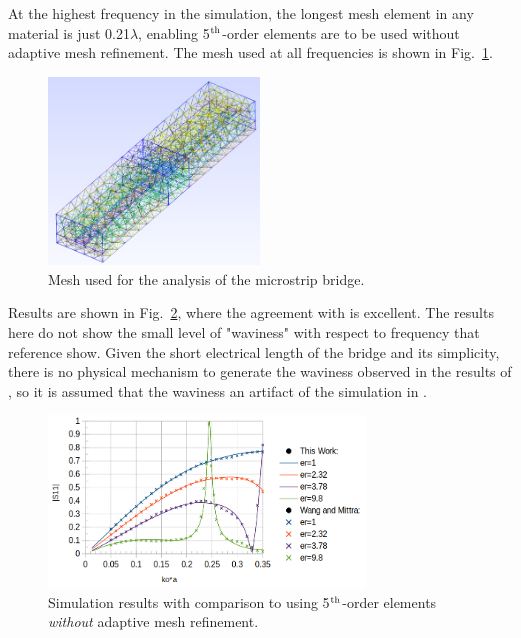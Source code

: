 \documentclass[titlepage]{article}
\renewcommand\_{\textunderscore\linebreak[1]}
\begin{document}
At the highest frequency in the simulation, the longest mesh element in any material is just 0.21$\lambda$, enabling 5$^{\textnormal{th}}$-order elements are to be used without adaptive mesh refinement.  The mesh used at all frequencies is shown in Fig.~\ref{fig:bridge_mesh}.

\begin{figure}[H]
  \centering
  \includegraphics[width=0.5\textwidth]{../regression/OpenParEM3D/microstrip/bridge_study/screenshots/bridge_mesh}
  \caption{Mesh used for the analysis of the microstrip bridge.}
  \label{fig:bridge_mesh}
\end{figure}

Results are shown in Fig.~\ref{fig:bridge_results}, where the agreement with \cite{Wang} is excellent.  The results here do not show the small level of "waviness" with respect to frequency that reference \cite{Wang} show.  Given the short electrical length of the bridge and its simplicity, there is no physical mechanism to generate the waviness observed in the results of \cite{Wang}, so it is assumed that the waviness an artifact of the simulation in \cite{Wang}.

\begin{figure}[H]
  \centering
  \includegraphics[width=0.75\textwidth]{../regression/OpenParEM3D/microstrip/bridge_study/screenshots/bridge_results}
  \caption{Simulation results with comparison to \cite{Wang} using 5$^{\textnormal{th}}$-order elements \textit{without} adaptive mesh refinement.}
  \label{fig:bridge_results}
\end{figure}
\end{document}

